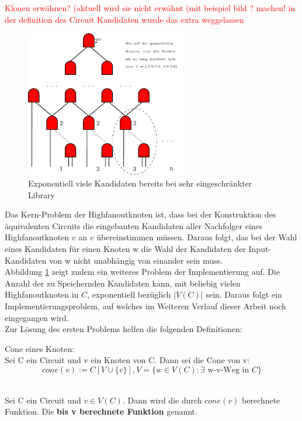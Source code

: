 \documentclass[11pt, a4paper, german]{article}
\begin{document}
\textcolor{red}{Klonen erwähnen? (aktuell wird sie nicht erwähnt (mit beispiel bild ? machen! in der definition des Circuit Kandidaten wurde das extra weggelassen}\\

\begin{figure}%
\includegraphics[width= 7cm]{pictures/compiled/expo_kand}
\caption{Exponentiell viele Kandidaten bereits bei sehr eingeschränkter Library}
\label{bild:expo_kan}
\end{figure}

Das Kern-Problem der Highfanoutknoten ist, dass bei der Konstruktion des äquivalenten Circuits die eingebauten Kandidaten aller Nachfolger eines Highfanoutknoten $v$ an $v$ übereinstimmen müssen. Daraus folgt, das bei der Wahl eines Kandidaten für einen Knoten w die Wahl der Kandidaten der Input-Kandidaten von w nicht unabhängig von einander sein muss. \\
Abbildung \ref{bild:expo_kan} zeigt zudem ein weiteres Problem der Implementierung auf. Die Anzahl der zu Speichernden Kandidaten kann, mit beliebig vielen Highfanoutknoten in $C$,  exponentiell bezüglich $|V(C)|$ sein. Daraus folgt ein Implementierungsproblem, auf welches im Weiteren Verlauf dieser Arbeit noch eingegangen wird. \\
Zur Lösung des ersten Problems helfen die folgenden Definitionen:\\

\begin{definition}{Cone eines Knoten:}\\
	Sei C ein Circuit und v ein Knoten von C. Dann sei die Cone von v: 
	\[ cone(v) := C[V \cup \{ v \}], V = \{ w \in V(C) : \exists \text{ w-v-Weg in }  C \} \] \end{definition}
\begin{definition}\  \\
	Sei C ein Circuit und  $v \in V(C)$. Dann wird die durch $cone(v)$ berechnete Funktion. Die 			{\bf bis v berechnete Funktion} genannt.
\end{definition}
\end{document}
